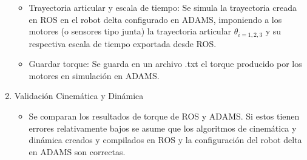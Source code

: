 \begin{enumerate}
\begin{itemize}
            \item {Trayectoria articular y escala de tiempo: Se simula la trayectoria creada en ROS en el robot delta configurado en ADAMS, imponiendo a los motores (o sensores tipo junta) la trayectoria articular $\theta_{i=1,2,3}$ y su respectiva escala de tiempo exportada desde ROS.}
            \item {Guardar torque: Se guarda en un archivo .txt el torque producido por los motores en simulación en ADAMS.  }
        \end{itemize}
        \item Validación Cinemática y Dinámica
        \begin{itemize}
            \item {Se comparan los resultados de torque de ROS y ADAMS. Si estos tienen errores relativamente bajos se asume que los algoritmos de cinemática y dinámica creados y compilados en ROS y la configuración del robot delta en ADAMS son correctas.}
        \end{itemize}  
    \end{enumerate}

        \newpage
        
        
